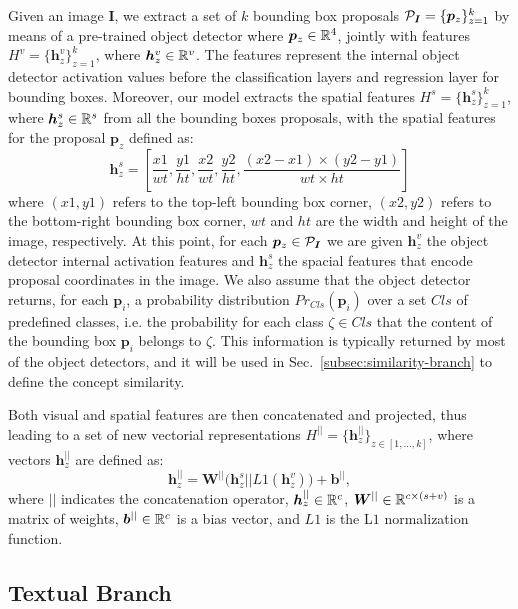 Given an image $\bm{I}$, we extract a set of $k$ bounding box
proposals $\mathcal{P}_{\bm{I}} = \{ \bm{p}_z \}^k_{z=1}$ by means of a
pre-trained object detector where $\bm{p}_z \in \mathbb{R}^4$, jointly with
features $H^v = \{ \bm{h}^v_z \}^k_{z=1}$, where $\bm{h}^v_z \in
\mathbb{R}^v$. The features represent the internal object detector
activation values before the classification layers and regression
layer for bounding boxes. Moreover, our model extracts the spatial
features $H^s = \{ \bm{h}^s_z \}^k_{z=1}$, where $\bm{h}^s_z \in
\mathbb{R}^s$ from all the bounding boxes proposals, with the spatial
features for the proposal $\bm{p}_z$ defined as:
\begin{equation}
  \bm{h}^s_z = \left[ \frac{x1}{wt}, \frac{y1}{ht}, \frac{x2}{wt}, \frac{y2}{ht}, \frac{(x2 - x1) \times (y2 - y1)}{wt \times ht}  \right]
\end{equation}
where $(x1, y1)$ refers to the top-left bounding box corner, $(x2,
y2)$ refers to the bottom-right bounding box corner, $wt$ and $ht$ are
the width and height of the image, respectively. At this point, for
each $\bm{p}_z \in \mathcal{P}_{\bm{I}}$ we are given $\bm{h}^v_z$ the
object detector internal activation features and $\bm{h}^s_z$ the
spacial features that encode proposal coordinates in the image. We
also assume that the object detector returns, for each $\bm{p}_i$, a
probability distribution $Pr_{Cls}(\bm{p}_i)$ over a set $Cls$ of
predefined classes, i.e. the probability for each class $\zeta \in
Cls$ that the content of the bounding box $\bm{p}_i$ belongs to
$\zeta$. This information is typically returned by most of the object
detectors, and it will be used in Sec.~\ref{subsec:similarity-branch}
to define the concept similarity.

Both visual and spatial features are then concatenated and projected,
thus leading to a set of new vectorial representations $H^{||} = \{
\bm{h}^{||}_{z} \}_{z \in [1, \ldots, k]}$, where vectors
$\bm{h}^{||}_{z}$ are defined as:
\begin{equation}
  \bm{h}^{||}_{z} = \bm{W}^{||} \big( \bm{h}^s_z || L1(\bm{h}^v_z) \big) + \bm{b}^{||},
  \label{eq:h-par-jz}
\end{equation}
where $||$ indicates the concatenation operator, $\bm{h}^{||}_{z} \in
\mathbb{R}^c$, $\bm{W}^{||} \in \mathbb{R}^{c \times (s + v)}$ is a matrix of
weights, $\bm{b}^{||} \in \mathbb{R}^c$ is a bias vector, and $L1$ is the
L$1$ normalization function.



\subsection{Textual Branch}
\label{subsec:textual-branch}

